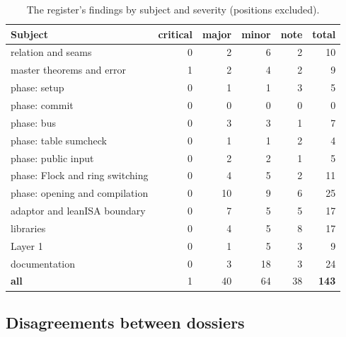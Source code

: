 \begin{table}[htbp]
\centering\small
\begin{tabular}{@{}lrrrrr@{}}
\toprule
Subject & critical & major & minor & note & total \\
\midrule
relation and seams & 0 & 2 & 6 & 2 & 10 \\
master theorems and error & 1 & 2 & 4 & 2 & 9 \\
phase: setup & 0 & 1 & 1 & 3 & 5 \\
phase: commit & 0 & 0 & 0 & 0 & 0 \\
phase: bus & 0 & 3 & 3 & 1 & 7 \\
phase: table sumcheck & 0 & 1 & 1 & 2 & 4 \\
phase: public input & 0 & 2 & 2 & 1 & 5 \\
phase: Flock and ring switching & 0 & 4 & 5 & 2 & 11 \\
phase: opening and compilation & 0 & 10 & 9 & 6 & 25 \\
adaptor and leanISA boundary & 0 & 7 & 5 & 5 & 17 \\
libraries & 0 & 4 & 5 & 8 & 17 \\
Layer 1 & 0 & 1 & 5 & 3 & 9 \\
documentation & 0 & 3 & 18 & 3 & 24 \\
\midrule
\textbf{all} & 1 & 40 & 64 & 38 & \textbf{143} \\
\bottomrule
\end{tabular}
\caption{The register's findings by subject and severity (positions excluded).}\label{tab:reg-count-subject}
\end{table}

\begingroup\sloppy
\subsection{Disagreements between dossiers}\label{sec:reg-disagreements}

